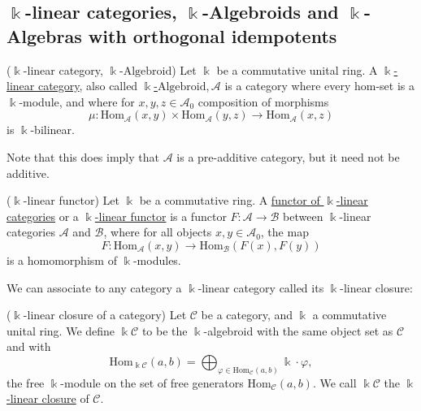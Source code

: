 \subsection{$\Bbbk$-linear categories, $\Bbbk$-Algebroids and $ \Bbbk$-Algebras with orthogonal idempotents}

\begin{definition}{($\Bbbk$-linear category, $\Bbbk$-$\mathrm{Algebroid}$)}
Let $\Bbbk$ be a commutative unital ring. A \ul{$\Bbbk$-linear category}, also called \ul{$\Bbbk$-$\mathrm{Algebroid}$},$\,\mathcal{A}$ is a
category where every hom-set is a $\Bbbk$-module, and where for $x,y,z \in \mathcal{A}_{0}$ composition of morphisms
\[
\mu : \mathrm{Hom}_{\mathcal{A}}(x,y) \times \mathrm{Hom}_{\mathcal{A}}(y,z) \rightarrow \mathrm{Hom}_{\mathcal{A}}(x,z)
\]
is $\Bbbk$-bilinear.

Note that this does imply that $\mathcal{A}$ is a pre-additive category, but it need not be additive.
\end{definition}

\begin{definition}{($\Bbbk$-linear functor)}
Let $\Bbbk$ be a commutative ring. A \ul{functor of $\Bbbk$-linear categories} or a \ul{$\Bbbk$-linear functor} is a functor
$F : \mathcal{A} \rightarrow \mathcal{B}$ between $\Bbbk$-linear categories $\mathcal{A}$ and $\mathcal{B}$,
where for all objects $x, y \in \mathcal{A}_{0}$, the map
\[
F : \mathrm{Hom}_{\mathcal{A}}(x,y) \rightarrow \mathrm{Hom}_{\mathcal{B}}(F(x), F(y))
\]
is a homomorphism of $\Bbbk$-modules.
\end{definition}

\noindent We can associate to any category a $\Bbbk$-linear category called its $\Bbbk$-linear closure:

\begin{definition}{($\Bbbk$-linear closure of a category)}
Let $\mathcal{C}$ be a category, and $\Bbbk$ a commutative unital ring. We define $\Bbbk \mathcal{C}$ to be
the $\Bbbk$-algebroid with the same object set as $\mathcal{C}$ and with 
\[
\mathrm{Hom}_{\Bbbk\mathcal{C}}(a,b) = \bigoplus_{\varphi \in \mathrm{Hom}_{\mathcal{C}}(a,b)} \Bbbk \cdot \varphi,
\]
the free $\Bbbk$-module on the set of free generators $\mathrm{Hom}_{\mathcal{C}}(a,b)$. We call $\Bbbk\mathcal{C}$ the
\ul{$\Bbbk$-linear closure} of $\mathcal{C}$.
\end{definition}


